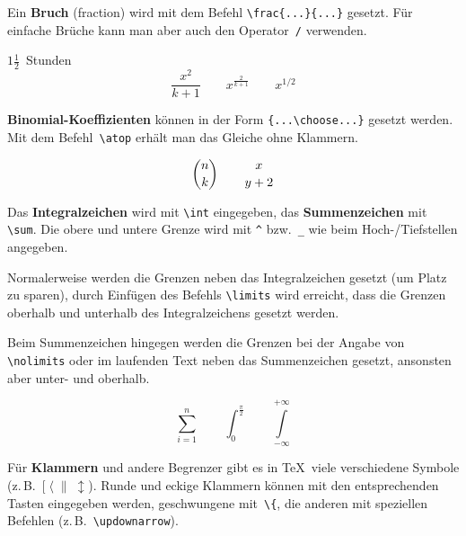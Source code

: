 Ein \textbf{Bruch} (fraction) wird mit dem Befehl
\lstinline|\frac{...}{...}| gesetzt.  Für einfache Brüche kann man
aber auch den Operator~\lstinline|/| verwenden.

\begin{LTXexample}
\(1\frac{1}{2}\)~Stunden
\begin{displaymath}
\frac{ x^{2} }{ k+1 } \qquad
x^{ \frac{2}{k+1} } \qquad
x^{ 1/2 }
\end{displaymath}
\end{LTXexample}


\textbf{Binomial-Koeffizienten} können in der Form
\lstinline|{...\choose...}| gesetzt werden.
Mit dem Befehl~\lstinline|\atop| erhält man das Gleiche ohne
Klammern.

\begin{LTXexample}
\begin{displaymath}
{ n \choose k } \qquad
{ x\atop y+2 }
\end{displaymath}
\end{LTXexample}


\medskip

Das \textbf{Integralzeichen} wird mit \lstinline|\int| eingegeben, das
\textbf{Summenzeichen} mit \lstinline|\sum|.
Die obere und untere Grenze wird mit \lstinline|^| bzw.~\lstinline|_| wie
beim \mbox{Hoch-}\slash Tiefstellen angegeben.
 
Normalerweise werden die Grenzen neben das Integralzeichen
gesetzt (um Platz zu sparen), durch Einfügen des Befehls
\lstinline|\limits| wird erreicht, dass die Grenzen oberhalb und
unterhalb des Integralzeichens gesetzt werden.
 
Beim Summenzeichen hingegen werden die Grenzen bei der Angabe von
\lstinline|\nolimits| oder im laufenden Text neben das Summenzeichen
gesetzt, ansonsten aber unter- und oberhalb.

\begin{LTXexample}
\begin{displaymath}
\sum_{i=1}^{n} \qquad
\int_{0}^{\frac{\pi}{2}} \qquad
\int \limits_{-\infty}^{+\infty}
\end{displaymath}
\end{LTXexample}
 
Für \textbf{Klammern} und andere Begrenzer gibt es in \TeX\ 
viele verschiedene Symbole
(z.\,B.~\([\;\langle\;\|\;\updownarrow\)).
Runde und eckige Klammern können mit den entsprechenden Tasten
eingegeben werden, geschwungene mit~\lstinline|\{|, die anderen mit
speziellen Befehlen (z.\,B.~\lstinline|\updownarrow|).
 
